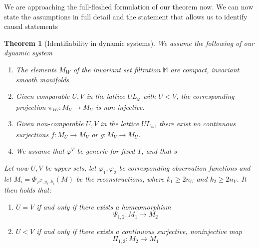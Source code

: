 \documentclass[11pt, a4paper]{memoir}
\theoremstyle{break}
\newtheorem{thm}{Theorem}
\theoremstyle{break}
\theoremstyle{nonumberplain}
\begin{document}
We are approaching the full-fleshed formulation of our theorem now. We can now state the assumptions in full detail and the statement that allows us to identify causal statements
\begin{thm}[Identifiability in dynamic systems]
We assume the following of our dynamic system
\begin{enumerate}[label=(I\arabic*)]
	\item The elements $M_W$ of the invariant set filtration $\mathbb{M}$ are compact, invariant \emph{smooth} manifolds. 
	\item Given comparable $U,V$ in the lattice $UL_\varphi$ with $U<V$, the corresponding projection $\pi_{VU}:M_V\to M_U$ is non-injective.
	\item Given non-comparable $U,V$ in the lattice $UL_\varphi$, there exist no continuous surjections $f:M_U\to M_V$ or $g:M_V\to M_U$.
	\item We assume that $\varphi^T$ be generic for fixed $T$, and that $s$
\end{enumerate}
Let now $U,V$ be upper sets, let $\varphi_1,\varphi_2$ be corresponding observation functions and let $M_i=\Phi_{\varphi^T,y_i,k_i}(M)$ be the reconstructions, where $k_1\geqslant 2n_U$ and $k_2\geqslant 2n_V$. It then holds that:
\begin{enumerate}[label=\roman*.]
	\item $U=V$ if and only if there exists a homeomorphism
	$$\Psi_{1,2}:M_1\to M_2$$
	\item $U<V$ if and only if there exists a continuous surjective, noninjective map
	$$\Pi_{1,2}:M_2\to M_1$$ 
\end{enumerate}
\end{thm}
\end{document}
